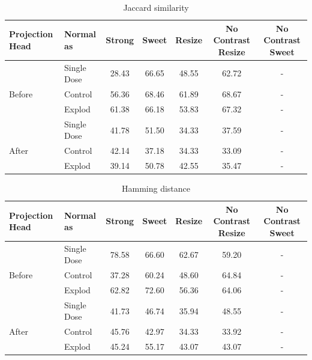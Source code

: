 \begin{table}[H]
  \centering
  \begin{tabular}{@{}llccccc@{}}
  \toprule
  Projection Head & Normal as       & Strong & Sweet & Resize & No Contrast Resize & No Contrast Sweet \\ \midrule
                  & Single Dose    & 28.43      & 66.65     & 48.55      & 62.72                  & -                 \\
  Before          & Control        & 56.36      & 68.46     & 61.89      & 68.67                  & -                 \\
                  & Explod         & 61.38      & 66.18     & 53.83      & 67.32                  & -                 \\ \midrule
                  & Single Dose    & 41.78      & 51.50     & 34.33      & 37.59                  & -                 \\
  After           & Control        & 42.14      & 37.18     & 34.33      & 33.09                  & -                 \\
                  & Explod         & 39.14      & 50.78     & 42.55      & 35.47                  & -                 \\ \bottomrule
  \end{tabular}
  \caption{Jaccard similarity}
  \label{tab:table_label}
\end{table}

\begin{table}[H]
  \centering
  \begin{tabular}{@{}llccccc@{}}
  \toprule
  Projection Head & Normal as       & Strong & Sweet & Resize & No Contrast Resize & No Contrast Sweet \\ \midrule
                  & Single Dose    & 78.58      & 66.60     & 62.67      & 59.20                  & -                 \\
  Before          & Control        & 37.28      & 60.24     & 48.60      & 64.84                  & -                 \\
                  & Explod         & 62.82      & 72.60     & 56.36      & 64.06                  & -                 \\ \midrule
                  & Single Dose    & 41.73      & 46.74     & 35.94      & 48.55                  & -                 \\
  After           & Control        & 45.76      & 42.97     & 34.33      & 33.92                  & -                 \\
                  & Explod         & 45.24      & 55.17     & 43.07      & 43.07                  & -                 \\ \bottomrule
  \end{tabular}
  \caption{Hamming  distance}
  \label{tab:table_label}
\end{table}




